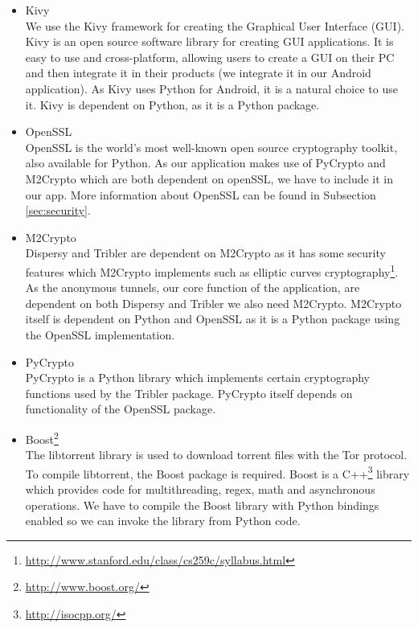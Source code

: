 		\begin{itemize}
		
			\item Kivy\\
			We use the Kivy framework for creating the Graphical User Interface (GUI). Kivy is an open source software library for creating GUI applications. It is easy to use and cross-platform, allowing users to create a GUI on their PC and then integrate it in their products (we integrate it in our Android application). As Kivy uses Python for Android, it is a natural choice to use it. Kivy is dependent on Python, as it is a Python package. 
		
			\item OpenSSL\\
			OpenSSL is the world's most well-known open source cryptography toolkit, also available for Python. As our application makes use of PyCrypto and M2Crypto which are both dependent on openSSL, we have to include it in our app. More information about OpenSSL can be found in Subsection \ref{sec:security}.
		
			\item M2Crypto\\
			Dispersy and Tribler are dependent on M2Crypto as it has some security features which M2Crypto implements such as elliptic curves cryptography\footnote{\url{http://www.stanford.edu/class/cs259c/syllabus.html}}. As the anonymous tunnels, our core function of the application, are dependent on both Dispersy and Tribler we also need M2Crypto. M2Crypto itself is dependent on Python and OpenSSL as it is a Python package using the OpenSSL implementation.
		
			\item PyCrypto\\
			PyCrypto is a Python library which implements certain cryptography functions used by the Tribler package. PyCrypto itself depends on functionality of the OpenSSL package.
		
			\item Boost\footnote{\url{http://www.boost.org/}}\\
			The libtorrent library is used to download torrent files with the Tor protocol. To compile libtorrent, the Boost package is required. Boost is a C++\footnote{\url{http://isocpp.org/}} library which provides code for multithreading, regex, math and asynchronous operations. We have to compile the Boost library with Python bindings enabled so we can invoke the library from Python code.
		

\end{itemize}
